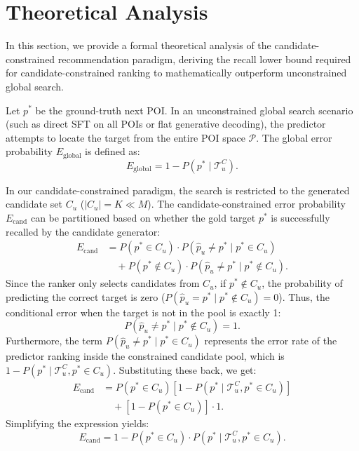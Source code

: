 \documentclass[10pt,twocolumn]{article}
\begin{document}
\section{Theoretical Analysis}
In this section, we provide a formal theoretical analysis of the candidate-constrained recommendation paradigm, deriving the recall lower bound required for candidate-constrained ranking to mathematically outperform unconstrained global search.

Let $p^*$ be the ground-truth next POI. In an unconstrained global search scenario (such as direct SFT on all POIs or flat generative decoding), the predictor attempts to locate the target from the entire POI space $\mathcal{P}$. The global error probability $E_{\mathrm{global}}$ is defined as:
\begin{equation}
    E_{\mathrm{global}} = 1 - P(p^* \mid \mathcal{T}^C_u).
\end{equation}

In our candidate-constrained paradigm, the search is restricted to the generated candidate set $C_u$ ($|C_u| = K \ll M$). The candidate-constrained error probability $E_{\mathrm{cand}}$ can be partitioned based on whether the gold target $p^*$ is successfully recalled by the candidate generator:
\begin{align}
    E_{\mathrm{cand}} &= P(p^* \in C_u) \cdot P(\hat{p}_u \neq p^* \mid p^* \in C_u) \nonumber \\
    &\quad + P(p^* \notin C_u) \cdot P(\hat{p}_u \neq p^* \mid p^* \notin C_u).
\end{align}
Since the ranker only selects candidates from $C_u$, if $p^* \notin C_u$, the probability of predicting the correct target is zero ($P(\hat{p}_u = p^* \mid p^* \notin C_u) = 0$). Thus, the conditional error when the target is not in the pool is exactly 1:
\begin{equation}
    P(\hat{p}_u \neq p^* \mid p^* \notin C_u) = 1.
\end{equation}
Furthermore, the term $P(\hat{p}_u \neq p^* \mid p^* \in C_u)$ represents the error rate of the predictor ranking inside the constrained candidate pool, which is $1 - P(p^* \mid \mathcal{T}^C_u, p^* \in C_u)$. Substituting these back, we get:
\begin{align}
    E_{\mathrm{cand}} &= P(p^* \in C_u) \left[ 1 - P(p^* \mid \mathcal{T}^C_u, p^* \in C_u) \right] \nonumber \\
    &\quad + \left[ 1 - P(p^* \in C_u) \right] \cdot 1.
\end{align}
Simplifying the expression yields:
\begin{equation}
    E_{\mathrm{cand}} = 1 - P(p^* \in C_u) \cdot P(p^* \mid \mathcal{T}^C_u, p^* \in C_u).
\end{equation}
\end{document}
